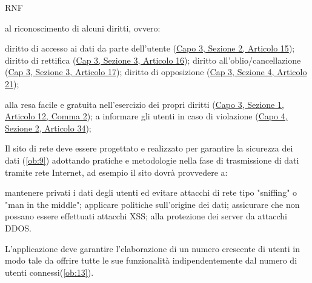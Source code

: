 \begin{listaPersonale}{RNF}
\begin{listaPersonale2}{}
         al riconoscimento di alcuni diritti, ovvero:
        \begin{listaPersonale3}{}
             diritto di accesso ai dati da parte dell'utente (\href{https://eur-lex.europa.eu/legal-content/IT/TXT/?uri=uriserv:OJ.L_.2016.119.01.0001.01.ITA&toc=OJ:L:2016:119:TOC#d1e2520-1-1}{Capo 3, Sezione 2, Articolo 15});
             diritto di rettifica (\href{https://eur-lex.europa.eu/legal-content/IT/TXT/?uri=uriserv:OJ.L_.2016.119.01.0001.01.ITA&toc=OJ:L:2016:119:TOC#d1e2606-1-1}{Cap 3, Sezione 3, Articolo 16});
             diritto all'oblio/cancellazione (\href{https://eur-lex.europa.eu/legal-content/IT/TXT/?uri=uriserv:OJ.L_.2016.119.01.0001.01.ITA&toc=OJ:L:2016:119:TOC#d1e2613-1-1}{Cap 3, Sezione 3, Articolo 17});
             diritto di opposizione (\href{https://eur-lex.europa.eu/legal-content/IT/TXT/?uri=uriserv:OJ.L_.2016.119.01.0001.01.ITA&toc=OJ:L:2016:119:TOC#d1e2810-1-1}{Cap 3, Sezione 4, Articolo 21});
        \end{listaPersonale3}

         alla resa facile e gratuita nell'esercizio dei propri diritti (\href{https://eur-lex.europa.eu/legal-content/IT/TXT/?uri=uriserv:OJ.L_.2016.119.01.0001.01.ITA&toc=OJ:L:2016:119:TOC#d1e2189-1-1}{Capo 3, Sezione 1, Articolo 12, Comma 2});
         a informare gli utenti in caso di violazione (\href{https://eur-lex.europa.eu/legal-content/IT/TXT/?uri=uriserv:OJ.L_.2016.119.01.0001.01.ITA&toc=OJ:L:2016:119:TOC#d1e3497-1-1}{Capo 4, Sezione 2, Articolo 34});
    \end{listaPersonale2}


     Il sito di rete deve essere progettato e realizzato per garantire la sicurezza dei dati (\ref{ob:9}) adottando pratiche e metodologie nella fase di trasmissione di dati tramite rete Internet, ad esempio il sito dovrà provvedere a:
    \begin{listaPersonale2}{}
         mantenere privati i dati degli utenti ed evitare attacchi di rete tipo "sniffing" o "man in the middle";
         applicare politiche sull'origine dei dati;
         assicurare che non possano essere effettuati attacchi XSS;
         alla protezione dei server da attacchi DDOS.
    \end{listaPersonale2}

     L'applicazione deve garantire l'elaborazione di un numero crescente di utenti in modo tale da offrire tutte le sue funzionalità indipendentemente dal numero di utenti connessi(\ref{ob:13}).


\end{listaPersonale}
